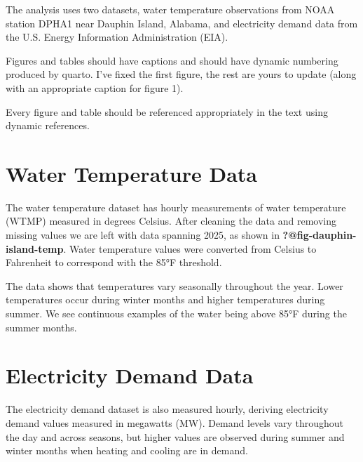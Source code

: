 \documentclass[
  letterpaper,
  DIV=11,
  numbers=noendperiod]{scrreprt}
\begin{document}
The analysis uses two datasets, water temperature observations from NOAA
station DPHA1 near Dauphin Island, Alabama, and electricity demand data
from the U.S. Energy Information Administration (EIA).

\begin{tcolorbox}[enhanced jigsaw, colframe=quarto-callout-note-color-frame, opacityback=0, left=2mm, toprule=.15mm, bottomtitle=1mm, opacitybacktitle=0.6, coltitle=black, leftrule=.75mm, breakable, colback=white, titlerule=0mm, title=\textcolor{quarto-callout-note-color}{\faInfo}\hspace{0.5em}{Note}, arc=.35mm, colbacktitle=quarto-callout-note-color!10!white, toptitle=1mm, bottomrule=.15mm, rightrule=.15mm]

Figures and tables should have captions and should have dynamic
numbering produced by quarto. I've fixed the first figure, the rest are
yours to update (along with an appropriate caption for figure 1).

Every figure and table should be referenced appropriately in the text
using dynamic references.

\end{tcolorbox}

\section{Water Temperature Data}\label{water-temperature-data-1}

The water temperature dataset has hourly measurements of water
temperature (WTMP) measured in degrees Celsius. After cleaning the data
and removing missing values we are left with data spanning 2025, as
shown in \textbf{?@fig-dauphin-island-temp}. Water temperature values
were converted from Celsius to Fahrenheit to correspond with the 85°F
threshold.

The data shows that temperatures vary seasonally throughout the year.
Lower temperatures occur during winter months and higher temperatures
during summer. We see continuous examples of the water being above 85°F
during the summer months.

\section{Electricity Demand Data}\label{electricity-demand-data-1}

The electricity demand dataset is also measured hourly, deriving
electricity demand values measured in megawatts (MW). Demand levels vary
throughout the day and across seasons, but higher values are observed
during summer and winter months when heating and cooling are in demand.
\end{document}
